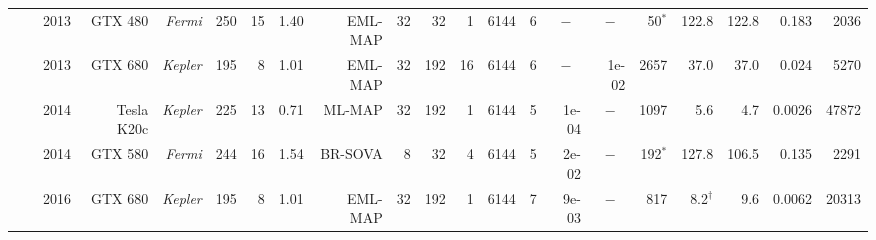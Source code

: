 \begin{table}
\begin{adjustbox}{angle=90}
{{\begin{tabular}{|r|r|r||r|r|r|r|r|r|r|r|r|r|r||r|r|r|r||r|r|r|}
                                                                 & \cite{Xianjun2013}                    & 2013                  & GTX 480                  & \textit{Fermi}                   & 250                  & 15                 & 1.40                   & EML-MAP                  & 32                  & 32                  & 1                   & 6144                  & 6                  & \multicolumn{1}{c|}{$-$}      & \multicolumn{1}{c|}{$-$} &     50$^*$    &  122.8           & 122.8          & 0.183         &   2036             \\ \cline{2-21}
                                                                 & \cite{Wu2013}                         & 2013                  & GTX 680                  & \textit{Kepler}                  & 195                  & 8                  & 1.01                   & EML-MAP                  & 32                  & 192                 & 16                  & 6144                  & 6                  & \multicolumn{1}{c|}{$-$}      & 1e-02                    &   2657        &   37.0           &  37.0          & 0.024         &   5270             \\ \cline{2-21}
                                                                 & \cite{Zhang2014}                      & 2014                  & Tesla K20c               & \textit{Kepler}                  & 225                  & 13                 & 0.71                   &  ML-MAP                  & 32                  & 192                 & 1                   & 6144                  & 5                  & 1e-04                         & \multicolumn{1}{c|}{$-$} &   1097        &    5.6           &   4.7          & 0.0026        &  47872             \\ \cline{2-21}
                                                                 & \cite{Li2014}                         & 2014                  & GTX 580                  & \textit{Fermi}                   & 244                  & 16                 & 1.54                   & BR-SOVA                  & 8                   & 32                  & 4                   & 6144                  & 5                  & 2e-02                         & \multicolumn{1}{c|}{$-$} &    192$^*$    &  127.8           & 106.5          & 0.135         &   2291             \\ \cline{2-21}
                                                                 & \multirow{2}{*}{\cite{Li2016a}}       & \multirow{2}{*}{2016} & \multirow{2}{*}{GTX 680} & \multirow{2}{*}{\textit{Kepler}} & \multirow{2}{*}{195} & \multirow{2}{*}{8} & \multirow{2}{*}{1.01}  & EML-MAP                  & \multirow{2}{*}{32} & \multirow{2}{*}{192} & \multirow{2}{*}{1} & \multirow{2}{*}{6144} & 7                  & \multirow{2}{*}{9e-03}        & \multicolumn{1}{c|}{$-$} &    817        &    8.2$^\dagger$ &   9.6          & 0.0062        &  20313             \\ \cline{9-9} \cline{14-14} \cline{16-21}

\end{tabular}}}
\end{adjustbox}
\end{table}
